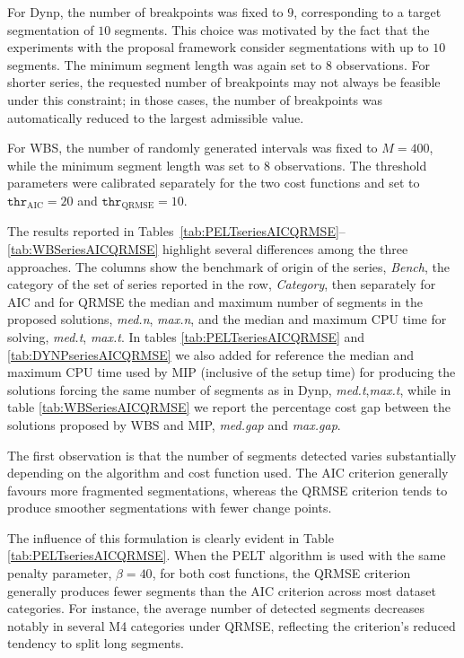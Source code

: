\documentclass[preprints,article,submit,pdftex,moreauthors]{Definitions/mdpi}
\begin{document}
For Dynp, the number of breakpoints was fixed to $9$, corresponding to a target segmentation of $10$ segments. This choice was motivated by the fact that the experiments with the proposal framework consider segmentations with up to $10$ segments. The minimum segment length was again set to $8$ observations. For shorter series, the requested number of breakpoints may not always be feasible under this constraint; in those cases, the number of breakpoints was automatically reduced to the largest admissible value.

For WBS, the number of randomly generated intervals was fixed to $M=400$, while the minimum segment length was set to $8$ observations. The threshold parameters were calibrated separately for the two cost functions and set to $\texttt{thr}_{\text{AIC}}=20$ and $\texttt{thr}_{\text{QRMSE}}=10$. 

The results reported in Tables~\ref{tab:PELTseriesAICQRMSE}--\ref{tab:WBSeriesAICQRMSE} highlight several differences among the three approaches. The columns show the benchmark of origin of the series, {\it Bench}, the category of the set of series reported in the row, {\it Category}, then separately for AIC and for QRMSE the median and maximum number of segments in the proposed solutions, {\it med.n}, {\it max.n}, and the median and maximum CPU time for solving, {\it med.t}, {\it max.t}. In tables \ref{tab:PELTseriesAICQRMSE} and \ref{tab:DYNPseriesAICQRMSE} we also added for reference the median and maximum CPU time used by MIP (inclusive of the setup time) for producing the solutions forcing the same number of segments as in Dynp, {\it med.t},{\it max.t}, while in table \ref{tab:WBSeriesAICQRMSE} we report the percentage cost gap between the solutions proposed by WBS and MIP, {\it med.gap} and {\it max.gap}.

The first observation is that the number of segments detected varies substantially depending on the algorithm and cost function used.  The AIC criterion generally favours more fragmented segmentations, whereas the QRMSE criterion tends to produce smoother segmentations with fewer change points. 

The influence of this formulation is clearly evident in Table \ref{tab:PELTseriesAICQRMSE}. When the PELT algorithm is used with the same penalty parameter, $\beta = 40$, for both cost functions, the QRMSE criterion generally produces fewer segments than the AIC criterion across most dataset categories. 
For instance, the average number of detected segments decreases notably in several M4 categories under QRMSE, reflecting the criterion's reduced tendency to split long segments.
\end{document}
